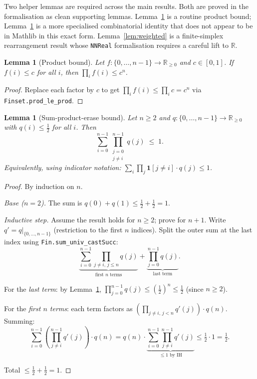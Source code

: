 \documentclass[reqno,11pt]{amsart}
\newcommand{\RR}{\mathbb{R}}
\newcommand{\Rnn}{\mathbb{R}_{\ge 0}}
\theoremstyle{plain}
\newtheorem{lemma}[theorem]{Lemma}
\theoremstyle{definition}
\theoremstyle{remark}
\begin{document}
Two helper lemmas are required across the main results. Both are proved in the formalisation as clean supporting lemmas. Lemma~\ref{lem:prod} is a routine product bound; Lemma~\ref{lem:sumprod} is a more specialised combinatorial identity that does not appear to be in Mathlib in this exact form. Lemma~\ref{lem:weighted} is a finite-simplex rearrangement result whose \texttt{NNReal} formalisation requires a careful lift to $\RR$.

\begin{lemma}[Product bound]\label{lem:prod}
Let $f : \{0,\ldots,n-1\} \to \Rnn$ and $c \in [0,1]$. If $f(i) \le c$ for all $i$, then $\prod_i f(i) \le c^n$.
\end{lemma}

\begin{proof}
Replace each factor by $c$ to get $\prod_i f(i) \le \prod_i c = c^n$ via \texttt{Finset.prod\_le\_prod}.
\end{proof}

\begin{lemma}[Sum-product-erase bound]\label{lem:sumprod}
Let $n \ge 2$ and $q : \{0,\ldots,n-1\} \to \Rnn$ with $q(i) \le \tfrac{1}{2}$ for all $i$. Then
\[
\sum_{i=0}^{n-1} \prod_{\substack{j=0\\j\ne i}}^{n-1} q(j) \;\le\; 1.
\]
Equivalently, using indicator notation: $\sum_i \prod_j \mathbf{1}[j \ne i]\cdot q(j) \le 1$.
\end{lemma}

\begin{proof}
By induction on $n$.

\emph{Base ($n = 2$).} The sum is $q(0) + q(1) \le \tfrac{1}{2} + \tfrac{1}{2} = 1$.

\emph{Inductive step.} Assume the result holds for $n \ge 2$; prove for $n+1$. Write $q' = q|_{\{0,\ldots,n-1\}}$ (restriction to the first $n$ indices). Split the outer sum at the last index using \texttt{Fin.sum\_univ\_castSucc}:
\[
\underbrace{\sum_{i=0}^{n-1} \prod_{j \ne i,\, j \le n} q(j)}_{\text{first } n \text{ terms}}
+ \underbrace{\prod_{j=0}^{n-1} q(j)}_{\text{last term}}.
\]

For the \emph{last term}: by Lemma~\ref{lem:prod}, $\prod_{j=0}^{n-1} q(j) \le (\tfrac{1}{2})^n \le \tfrac{1}{2}$ (since $n \ge 2$).

For the \emph{first $n$ terms}: each term factors as $\left(\prod_{j \ne i,\, j < n} q'(j)\right) \cdot q(n)$. Summing:
\[
\sum_{i=0}^{n-1}\left(\prod_{j \ne i}^{n-1} q'(j)\right) \cdot q(n)
= q(n) \cdot \underbrace{\sum_{i=0}^{n-1}\prod_{j \ne i}^{n-1} q'(j)}_{\le 1 \text{ by IH}} \le \tfrac{1}{2} \cdot 1 = \tfrac{1}{2}.
\]

Total $\le \tfrac{1}{2} + \tfrac{1}{2} = 1$.
\end{proof}
\end{document}
